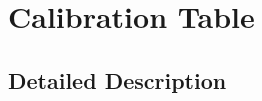 \hypertarget{group__calibration__table}{\section{Calibration Table}
\label{group__calibration__table}
}


\subsection{Detailed Description}
